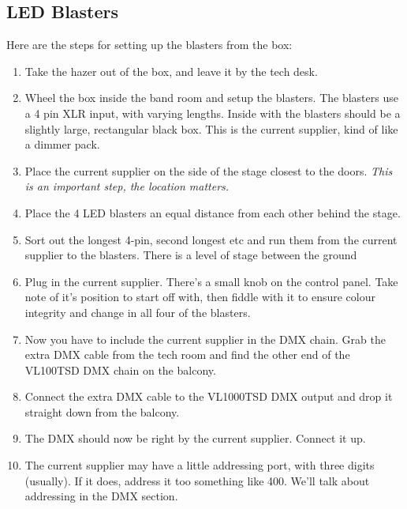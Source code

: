 \documentclass[letterpaper,10pt,oneside,headsepline]{scrreprt}
\begin{document}
\subsection{LED Blasters}
Here are the steps for setting up the blasters from the box:
\begin{enumerate}
\item Take the hazer out of the box, and leave it by the tech desk.
\item Wheel the box inside the band room and setup the blasters. The blasters use a 4 pin XLR input, with varying lengths. Inside with the blasters should be a slightly large, rectangular black box. This is the current supplier, kind of like a dimmer pack.
\item Place the current supplier on the side of the stage closest to the doors. \textit{This is an important step, the location matters.}
\item Place the 4 LED blasters an equal distance from each other behind the stage. 
\item Sort out the longest 4-pin, second longest etc and run them from the current supplier to the blasters. There is a level of stage between the ground

\item Plug in the current supplier. There's a small knob on the control panel. Take note of it's position to start off with, then fiddle with it to ensure colour integrity and change in all four of the blasters. 
\item Now you have to include the current supplier in the DMX chain. Grab the extra DMX cable from the tech room and find the other end of the VL100TSD DMX chain on the balcony.
\item Connect the extra DMX cable to the VL1000TSD DMX output and drop it straight down from the balcony.
\item The DMX should now be right by the current supplier. Connect it up.
\item The current supplier may have a little addressing port, with three digits (usually). If it does, address it too something like 400. We'll talk about addressing in the DMX section.
\end{enumerate}
\end{document}
